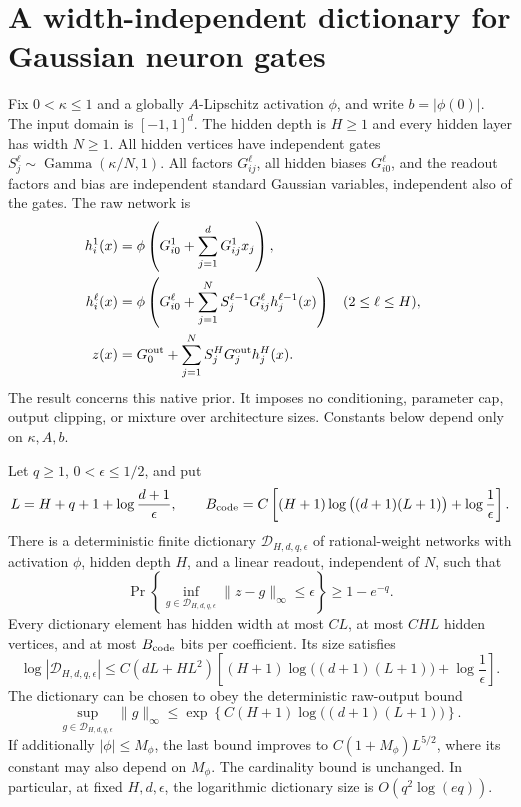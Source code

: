 \section{A width-independent dictionary for Gaussian neuron gates}
\label{sec:gaussian-ard-compression}
Fix $0<\kappa\le1$ and a globally $A$-Lipschitz activation $\phi$, and write $b=|\phi(0)|$. The input domain is $[-1,1]^d$. The hidden depth is $H\ge1$ and every hidden layer has width $N\ge1$. All hidden vertices have independent gates $S_j^\ell\sim\operatorname{Gamma}(\kappa/N,1)$. All factors $G_{ij}^\ell$, all hidden biases $G_{i0}^\ell$, and the readout factors and bias are independent standard Gaussian variables, independent also of the gates. The raw network is
\begin{align*}
 h_i^1(x)&=\phi\left(G_{i0}^1+\sum_{j=1}^dG_{ij}^1x_j\right),\\
 h_i^\ell(x)&=\phi\left(G_{i0}^\ell+\sum_{j=1}^N S_j^{\ell-1}G_{ij}^\ell h_j^{\ell-1}(x)\right)
                    &&(2\le\ell\le H),\\
 z(x)&=G_0^{\rm out}+\sum_{j=1}^N S_j^HG_j^{\rm out}h_j^H(x).
\end{align*}
The result concerns this native prior. It imposes no conditioning, parameter cap, output clipping, or mixture over architecture sizes. Constants below depend only on $\kappa,A,b$.

\begin{theorem}
\label{thm:gaussian-ard-compression}
Let $q\ge1$, $0<\epsilon\le1/2$, and put
\[
 L=H+q+1+\log\frac{d+1}{\epsilon},\qquad
 B_{\rm code}=C\left[(H+1)\log\big((d+1)(L+1)\big)
                         +\log\frac1\epsilon\right].
\]
There is a deterministic finite dictionary $\mathcal D_{H,d,q,\epsilon}$ of rational-weight networks with activation $\phi$, hidden depth $H$, and a linear readout, independent of $N$, such that
\[
 \Pr\left\{\inf_{g\in\mathcal D_{H,d,q,\epsilon}}
                  \|z-g\|_\infty\le\epsilon\right\}\ge1-e^{-q}.
\]
Every dictionary element has hidden width at most $CL$, at most $CHL$ hidden vertices, and at most $B_{\rm code}$ bits per coefficient. Its size satisfies
\begin{equation}
 \log|\mathcal D_{H,d,q,\epsilon}|
 \le C(dL+HL^2)
       \left[(H+1)\log\big((d+1)(L+1)\big)
                               +\log\frac1\epsilon\right].
 \label{eq:gaussian-ard-code-budget}
\end{equation}
The dictionary can be chosen to obey the deterministic raw-output bound
\begin{equation}
 \sup_{g\in\mathcal D_{H,d,q,\epsilon}}\|g\|_\infty
 \le \exp\left\{C(H+1)\log\big((d+1)(L+1)\big)\right\}.
 \label{eq:gaussian-ard-code-envelope}
\end{equation}
If additionally $|\phi|\le M_\phi$, the last bound improves to $C(1+M_\phi)L^{5/2}$, where its constant may also depend on $M_\phi$. The cardinality bound is unchanged. In particular, at fixed $H,d,\epsilon$, the logarithmic dictionary size is $O(q^2\log(e q))$.
\end{theorem}

